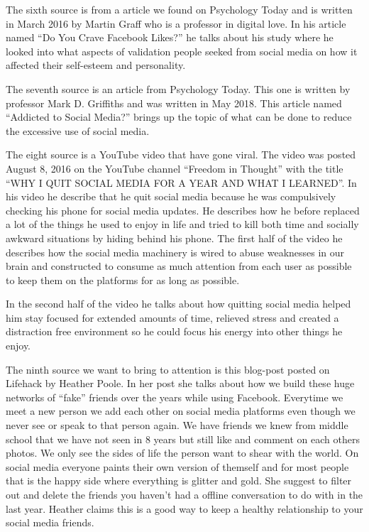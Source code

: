 \documentclass[11pt]{article}
\begin{document}
The sixth source \cite{psychologytoday1} is from a article we found on Psychology Today
and is written in March 2016 by Martin Graff who is a professor in digital love. In his
article named “Do You Crave Facebook Likes?” he talks about his study where he looked
into what aspects of validation people seeked from social media on how it affected
their self-esteem and personality.

The seventh source \cite{psychologytoday2} is an article from Psychology Today. This
one is written by professor Mark D. Griffiths and was written in May 2018. This article
named “Addicted to Social Media?” brings up the topic of what can be done to reduce the
excessive use of social media.

The eight source \cite{youtube3} is a YouTube video that have gone viral. The video was
posted August 8, 2016 on the YouTube channel “Freedom in Thought” with the title “WHY I
QUIT SOCIAL MEDIA FOR A YEAR AND WHAT I LEARNED”. In his video he describe that he quit
social media because he was compulsively checking his phone for social media updates. He
describes how he before replaced a lot of the things he used to enjoy in life and tried
to kill both time and socially awkward situations by hiding behind his phone. The first
half of the video he describes how the social media machinery is wired to abuse
weaknesses in our brain and constructed to consume as much attention from each user as
possible to keep them on the platforms for as long as possible.

In the second half of the video he talks about how quitting social media helped him stay
focused for extended amounts of time, relieved stress and created a distraction free
environment so he could focus his energy into other things he enjoy.

The ninth source \cite{lifehack} we want to bring to attention is this blog-post posted
on Lifehack by Heather Poole. In her post she talks about how we build these huge
networks of “fake” friends over the years while using Facebook. Everytime we meet a new
person we add each other on social media platforms even though we never see or speak to
that person again. We have friends we knew from middle school that we have not seen in
8 years but still like and comment on each others photos. We only see the sides of life
the person want to shear with the world. On social media everyone paints their own
version of themself and for most people that is the happy side where everything is
glitter and gold. She suggest to filter out and delete the friends you haven’t had a
offline conversation to do with in the last year. Heather claims this is a good way to
keep a healthy relationship to your social media friends.
\end{document}
